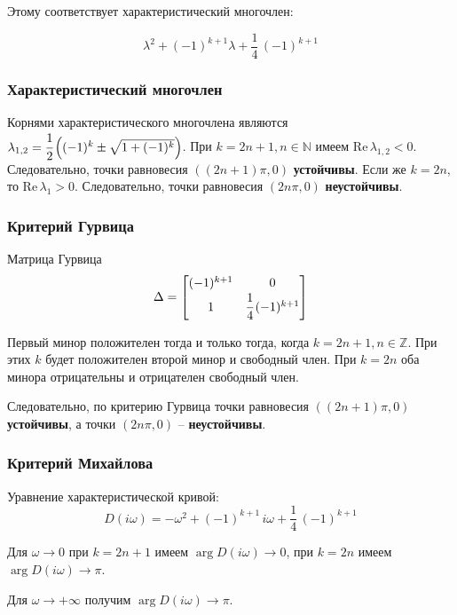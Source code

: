 \documentclass[a4paper,12pt]{article}
\begin{document}
    Этому соответствует характеристический многочлен:

    \begin{equation}
        \lambda^2 + (-1)^{k+1}\lambda + \frac{1}{4}\, (-1)^{k+1}
        \label{eq:char_polyn}
    \end{equation}
    \subsubsection{Характеристический многочлен}
    Корнями характеристического многочлена являются $\lambda_{1,2} = \cfrac{1}{2} \left((-1)^k \pm \sqrt{1 + (-1)^k} \right)$.
    При $k = 2n + 1, n \in \mathbb{N}$ имеем $\mathrm{Re}\, \lambda_{1, 2} < 0$.
    Следовательно, точки равновесия $((2n + 1)\pi, 0)$ \textbf{устойчивы}.
    Если же $k = 2n$, то $\mathrm{Re}\, \lambda_1 > 0$.
    Следовательно, точки равновесия $(2n\pi, 0)$ \textbf{неустойчивы}.
    \subsubsection{Критерий Гурвица}
    Матрица Гурвица
    \[
    \Delta = \begin{bmatrix}
        (-1)^{k+1} & 0 \\
        1 & \cfrac{1}{4}\, (-1)^{k+1}
    \end{bmatrix}
    \]

    Первый минор положителен тогда и только тогда, когда $k = 2n + 1, n \in \mathbb{Z}$.
    При этих $k$ будет положителен второй минор и свободный член.
    При $k = 2n$ оба минора отрицательны и отрицателен свободный член.

    Следовательно, по критерию Гурвица точки равновесия $((2n+1)\pi, 0)$ \textbf{устойчивы}, а точки $(2n\pi, 0)$ -- \textbf{неустойчивы}.

    \subsubsection{Критерий Михайлова}
    Уравнение характеристической кривой:
    \begin{equation}
        D(i\omega) = -\omega^2 + (-1)^{k+1}\, i \omega + \frac{1}{4}\, (-1)^{k+1}
        \label{eq:mihalich}
    \end{equation}

    Для $\omega \rightarrow 0$ при $k = 2n+1$ имеем $\arg D (i \omega) \rightarrow 0$, при $k = 2n$ имеем $\arg D(i\omega) \rightarrow \pi$.

    Для $\omega \rightarrow +\infty$ получим $\arg D(i\omega) \rightarrow \pi$.
\end{document}
